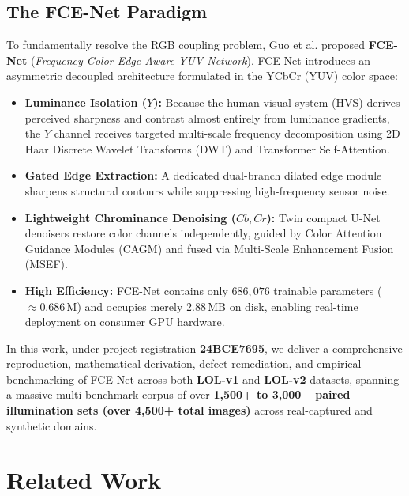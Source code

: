 \documentclass[10pt,twocolumn,letterpaper]{article}
\begin{document}
\subsection{The FCE-Net Paradigm}
To fundamentally resolve the RGB coupling problem, Guo et al. \cite{guo2026fcenet} proposed \textbf{FCE-Net} (\textit{Frequency-Color-Edge Aware YUV Network}). FCE-Net introduces an asymmetric decoupled architecture formulated in the YCbCr (YUV) color space:
\begin{itemize}
    \item \textbf{Luminance Isolation ($Y$):} Because the human visual system (HVS) derives perceived sharpness and contrast almost entirely from luminance gradients, the $Y$ channel receives targeted multi-scale frequency decomposition using 2D Haar Discrete Wavelet Transforms (DWT) and Transformer Self-Attention.
    \item \textbf{Gated Edge Extraction:} A dedicated dual-branch dilated edge module sharpens structural contours while suppressing high-frequency sensor noise.
    \item \textbf{Lightweight Chrominance Denoising ($Cb, Cr$):} Twin compact U-Net denoisers restore color channels independently, guided by Color Attention Guidance Modules (CAGM) and fused via Multi-Scale Enhancement Fusion (MSEF).
    \item \textbf{High Efficiency:} FCE-Net contains only $686,076$ trainable parameters ($\approx 0.686$\,M) and occupies merely 2.88\,MB on disk, enabling real-time deployment on consumer GPU hardware.
\end{itemize}

In this work, under project registration \textbf{24BCE7695}, we deliver a comprehensive reproduction, mathematical derivation, defect remediation, and empirical benchmarking of FCE-Net across both \textbf{LOL-v1} and \textbf{LOL-v2} datasets, spanning a massive multi-benchmark corpus of over \textbf{1,500+ to 3,000+ paired illumination sets (over 4,500+ total images)} across real-captured and synthetic domains.

\section{Related Work}
\end{document}
